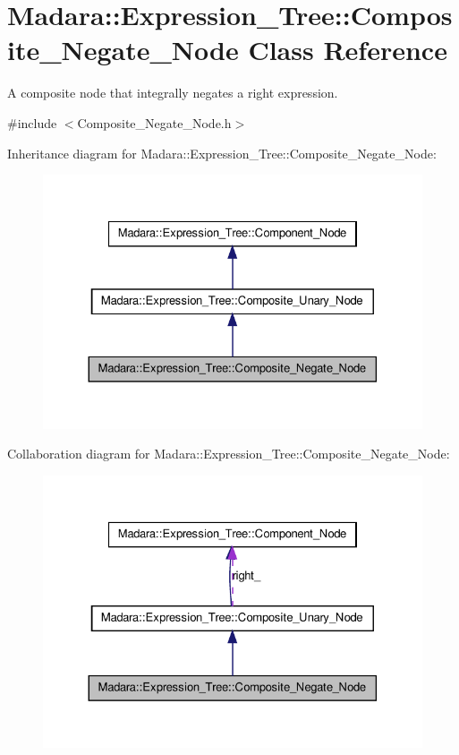 \hypertarget{classMadara_1_1Expression__Tree_1_1Composite__Negate__Node}{
\section{Madara::Expression\_\-Tree::Composite\_\-Negate\_\-Node Class Reference}
\label{d1/d20/classMadara_1_1Expression__Tree_1_1Composite__Negate__Node}
}


A composite node that integrally negates a right expression.  




{\ttfamily \#include $<$Composite\_\-Negate\_\-Node.h$>$}



Inheritance diagram for Madara::Expression\_\-Tree::Composite\_\-Negate\_\-Node:
\nopagebreak
\begin{figure}[H]
\begin{center}
\leavevmode
\includegraphics[width=326pt]{da/df6/classMadara_1_1Expression__Tree_1_1Composite__Negate__Node__inherit__graph}
\end{center}
\end{figure}


Collaboration diagram for Madara::Expression\_\-Tree::Composite\_\-Negate\_\-Node:
\nopagebreak
\begin{figure}[H]
\begin{center}
\leavevmode
\includegraphics[width=326pt]{d4/d7c/classMadara_1_1Expression__Tree_1_1Composite__Negate__Node__coll__graph}
\end{center}
\end{figure}
